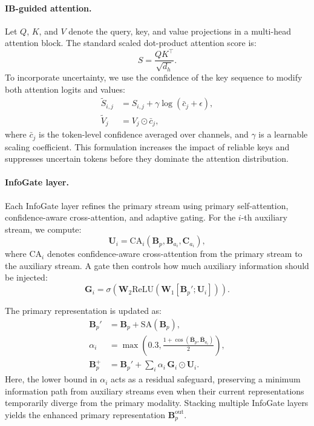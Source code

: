 \documentclass[11pt]{article}
\begin{document}
\paragraph{IB-guided attention.}
Let $Q$, $K$, and $V$ denote the query, key, and value projections in a
multi-head attention block. The standard scaled dot-product attention score is:
\begin{equation}
S =
\frac{QK^{\top}}{\sqrt{d_h}}.
\end{equation}
To incorporate uncertainty, we use the confidence of the key sequence to
modify both attention logits and values:
\begin{equation}
\begin{aligned}
\tilde{S}_{i,j}
&=
S_{i,j}
+
\gamma\log(\bar{c}_j+\epsilon),
\\
\tilde{V}_j
&=
V_j \odot \bar{c}_j,
\end{aligned}
\end{equation}
where $\bar{c}_j$ is the token-level confidence averaged over channels, and
$\gamma$ is a learnable scaling coefficient. This formulation increases the
impact of reliable keys and suppresses uncertain tokens before they dominate
the attention distribution.

\paragraph{InfoGate layer.}
Each InfoGate layer refines the primary stream using primary self-attention,
confidence-aware cross-attention, and adaptive gating. For the $i$-th
auxiliary stream, we compute:
\begin{equation}
\mathbf{U}_i =
\mathrm{CA}_i(\mathbf{B}_p,\mathbf{B}_{a_i},\mathbf{C}_{a_i}),
\end{equation}
where $\mathrm{CA}_i$ denotes confidence-aware cross-attention from the
primary stream to the auxiliary stream. A gate then controls how much
auxiliary information should be injected:
\begin{equation}
\mathbf{G}_i
=
\sigma\!\left(
\mathbf{W}_2
\mathrm{ReLU}
(
\mathbf{W}_1[\mathbf{B}_p';\mathbf{U}_i]
)
\right).
\end{equation}

The primary representation is updated as:
\begin{equation}
\begin{aligned}
\mathbf{B}_p'
&=
\mathbf{B}_p+\mathrm{SA}(\mathbf{B}_p),
\\
\alpha_i
&=
\max\!\left(
0.3,
\frac{1+\cos(\bar{\mathbf{B}}_p,\bar{\mathbf{B}}_{a_i})}{2}
\right),
\\
\mathbf{B}_p^{+}
&=
\mathbf{B}_p'
+
\sum_{i}
\alpha_i\,\mathbf{G}_i\odot\mathbf{U}_i.
\end{aligned}
\end{equation}
Here, the lower bound in $\alpha_i$ acts as a residual safeguard, preserving a
minimum information path from auxiliary streams even when their current
representations temporarily diverge from the primary modality. Stacking
multiple InfoGate layers yields the enhanced primary representation
$\mathbf{B}_p^{\mathrm{out}}$.
\end{document}
